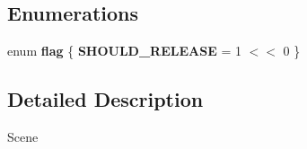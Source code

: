 \subsection*{\-Enumerations}
\begin{DoxyCompactItemize}
\item 
enum {\bfseries flag} \{ {\bfseries \-S\-H\-O\-U\-L\-D\-\_\-\-R\-E\-L\-E\-A\-S\-E} =  1 $<$$<$ 0
 \}
\end{DoxyCompactItemize}


\subsection{\-Detailed \-Description}
\-Scene 